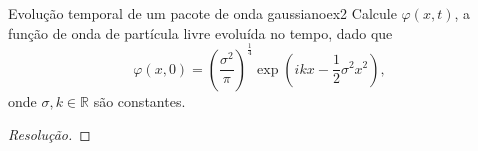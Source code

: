 \begin{exercício}{Evolução temporal de um pacote de onda gaussiano}{ex2}
   Calcule \(\varphi(x,t)\), a função de onda de partícula livre evoluída no tempo, dado que
   \begin{equation*}
      \varphi(x,0) = \left(\frac{\sigma^2}{\pi}\right)^{\frac14}\exp\left(ikx - \frac12 \sigma^2 x^2\right),
   \end{equation*}
   onde \(\sigma, k \in \mathbb{R}\) são constantes.
\end{exercício}
\begin{proof}[Resolução]
    
\end{proof}
